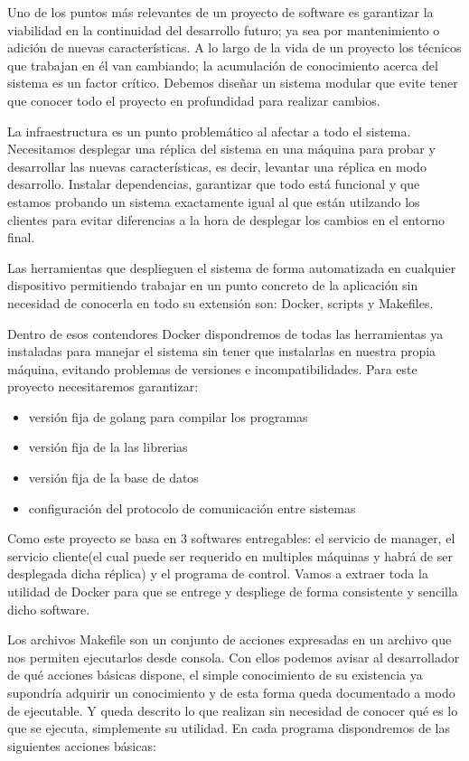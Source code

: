 
Uno de los puntos más relevantes de un proyecto de software es garantizar la viabilidad en la continuidad del desarrollo futuro; ya sea por mantenimiento o adición de nuevas características. A lo largo de la vida de un proyecto los técnicos que trabajan en él van cambiando; la acumulación de conocimiento acerca del sistema es un factor crítico. Debemos diseñar un sistema modular que evite tener que conocer todo el proyecto en profundidad para realizar cambios.

La infraestructura es un punto problemático al afectar a todo el sistema. Necesitamos desplegar una réplica del sistema en una máquina para probar y desarrollar las nuevas características, es decir, levantar una réplica en modo desarrollo. Instalar dependencias, garantizar que todo está funcional y que estamos probando un sistema exactamente igual al que están utilzando los clientes para evitar diferencias a la hora de desplegar los cambios en el entorno final.

Las herramientas que desplieguen el sistema de forma automatizada en cualquier dispositivo permitiendo trabajar en un punto concreto de la aplicación sin necesidad de conocerla en todo su extensión son: Docker, scripts y Makefiles.

Dentro de esos contendores Docker dispondremos de todas las herramientas ya instaladas para manejar el sistema sin tener que instalarlas en nuestra propia máquina, evitando problemas de versiones e incompatibilidades. Para este proyecto necesitaremos garantizar:

\begin{itemize}
    \item versión fija de golang para compilar los programas
    \item versión fija de la las librerias
    \item versión fija de la base de datos
    \item configuración del protocolo de comunicación entre sistemas
\end{itemize}

Como este proyecto se basa en 3 softwares entregables: el servicio de manager, el servicio cliente(el cual puede ser requerido en multiples máquinas y habrá de ser desplegada dicha réplica) y el programa de control. Vamos a extraer toda la utilidad de Docker para que se entrege y despliege de forma consistente y sencilla dicho software.

Los archivos Makefile son un conjunto de acciones expresadas en un archivo que nos permiten ejecutarlos desde consola. Con ellos podemos avisar al desarrollador de qué acciones básicas dispone, el simple conocimiento de su existencia ya supondría adquirir un conocimiento y de esta forma queda documentado a modo de ejecutable. Y queda descrito lo que realizan sin necesidad de conocer qué es lo que se ejecuta, simplemente su utilidad. En cada programa dispondremos de las siguientes acciones básicas:


